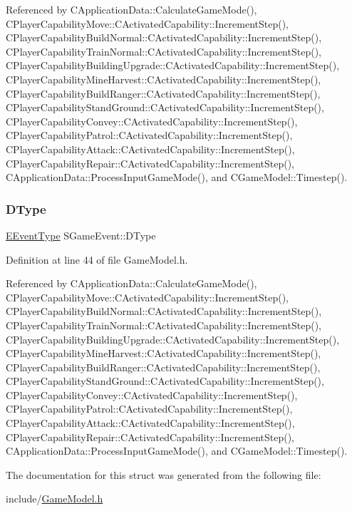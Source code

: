Referenced by C\+Application\+Data\+::\+Calculate\+Game\+Mode(), C\+Player\+Capability\+Move\+::\+C\+Activated\+Capability\+::\+Increment\+Step(), C\+Player\+Capability\+Build\+Normal\+::\+C\+Activated\+Capability\+::\+Increment\+Step(), C\+Player\+Capability\+Train\+Normal\+::\+C\+Activated\+Capability\+::\+Increment\+Step(), C\+Player\+Capability\+Building\+Upgrade\+::\+C\+Activated\+Capability\+::\+Increment\+Step(), C\+Player\+Capability\+Mine\+Harvest\+::\+C\+Activated\+Capability\+::\+Increment\+Step(), C\+Player\+Capability\+Build\+Ranger\+::\+C\+Activated\+Capability\+::\+Increment\+Step(), C\+Player\+Capability\+Stand\+Ground\+::\+C\+Activated\+Capability\+::\+Increment\+Step(), C\+Player\+Capability\+Convey\+::\+C\+Activated\+Capability\+::\+Increment\+Step(), C\+Player\+Capability\+Patrol\+::\+C\+Activated\+Capability\+::\+Increment\+Step(), C\+Player\+Capability\+Attack\+::\+C\+Activated\+Capability\+::\+Increment\+Step(), C\+Player\+Capability\+Repair\+::\+C\+Activated\+Capability\+::\+Increment\+Step(), C\+Application\+Data\+::\+Process\+Input\+Game\+Mode(), and C\+Game\+Model\+::\+Timestep().

\hypertarget{structSGameEvent_afa10562e243f4ac2b473b655cc58fee7}{}\label{structSGameEvent_afa10562e243f4ac2b473b655cc58fee7} 
\subsubsection{\texorpdfstring{D\+Type}{DType}}
{\footnotesize\ttfamily \hyperlink{GameModel_8h_abfcf510bafec7c6429906a6ecaac656d}{E\+Event\+Type} S\+Game\+Event\+::\+D\+Type}



Definition at line 44 of file Game\+Model.\+h.



Referenced by C\+Application\+Data\+::\+Calculate\+Game\+Mode(), C\+Player\+Capability\+Move\+::\+C\+Activated\+Capability\+::\+Increment\+Step(), C\+Player\+Capability\+Build\+Normal\+::\+C\+Activated\+Capability\+::\+Increment\+Step(), C\+Player\+Capability\+Train\+Normal\+::\+C\+Activated\+Capability\+::\+Increment\+Step(), C\+Player\+Capability\+Building\+Upgrade\+::\+C\+Activated\+Capability\+::\+Increment\+Step(), C\+Player\+Capability\+Mine\+Harvest\+::\+C\+Activated\+Capability\+::\+Increment\+Step(), C\+Player\+Capability\+Build\+Ranger\+::\+C\+Activated\+Capability\+::\+Increment\+Step(), C\+Player\+Capability\+Stand\+Ground\+::\+C\+Activated\+Capability\+::\+Increment\+Step(), C\+Player\+Capability\+Convey\+::\+C\+Activated\+Capability\+::\+Increment\+Step(), C\+Player\+Capability\+Patrol\+::\+C\+Activated\+Capability\+::\+Increment\+Step(), C\+Player\+Capability\+Attack\+::\+C\+Activated\+Capability\+::\+Increment\+Step(), C\+Player\+Capability\+Repair\+::\+C\+Activated\+Capability\+::\+Increment\+Step(), C\+Application\+Data\+::\+Process\+Input\+Game\+Mode(), and C\+Game\+Model\+::\+Timestep().



The documentation for this struct was generated from the following file\+:\begin{DoxyCompactItemize}
\item 
include/\hyperlink{GameModel_8h}{Game\+Model.\+h}\end{DoxyCompactItemize}
